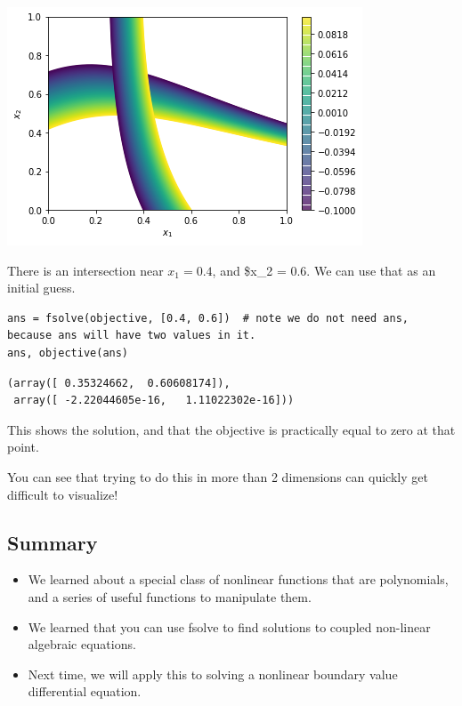 \documentclass[11pt]{article}
\begin{document}
\begin{center}
\includegraphics[width=.9\linewidth]{obipy-resources/2cebf4017bd84c109f67e80d93d1304b-26729XzN.png}
\end{center}

There is an intersection near \(x_1=0.4\), and \$x\_2 = 0.6. We can use that as an initial guess.

\begin{verbatim}
ans = fsolve(objective, [0.4, 0.6])  # note we do not need ans, because ans will have two values in it.
ans, objective(ans)
\end{verbatim}

\begin{verbatim}
(array([ 0.35324662,  0.60608174]),
 array([ -2.22044605e-16,   1.11022302e-16]))
\end{verbatim}

This shows the solution, and that the objective is practically equal to zero at that point.

You can see that trying to do this in more than 2 dimensions can quickly get difficult to visualize!

\subsection{Summary}
\label{sec:org4b6521a}

\begin{itemize}
\item We learned about a special class of nonlinear functions that are polynomials, and a series of useful functions to manipulate them.

\item We learned that you can use fsolve to find solutions to coupled non-linear algebraic equations.

\item Next time, we will apply this to solving a nonlinear boundary value differential equation.
\end{itemize}
\end{document}
